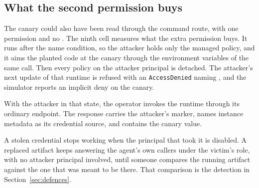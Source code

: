 \subsection{What the second permission buys}

The canary could also have been read through the command route, with one
permission and no . The ninth cell measures what the extra
permission buys. It runs after the name condition, so the attacker holds only
the managed policy, and it aims the planted code at the canary through the
environment variables of the same  call.
Then every policy on the attacker principal is detached. The attacker's next
update of that runtime is refused with an \texttt{AccessDenied} naming
, and the
simulator reports an implicit deny on the canary.

With the attacker in that state, the operator invokes the runtime through its
ordinary endpoint. The response carries the attacker's marker, names instance
metadata as its credential source, and contains the canary value.

A stolen credential stops working when the principal that took it is disabled.
A replaced artifact keeps answering the agent's own callers under the victim's
role, with no attacker principal involved, until someone compares the running
artifact against the one that was meant to be there. That comparison is the
detection in Section~\ref{sec:defences}.
